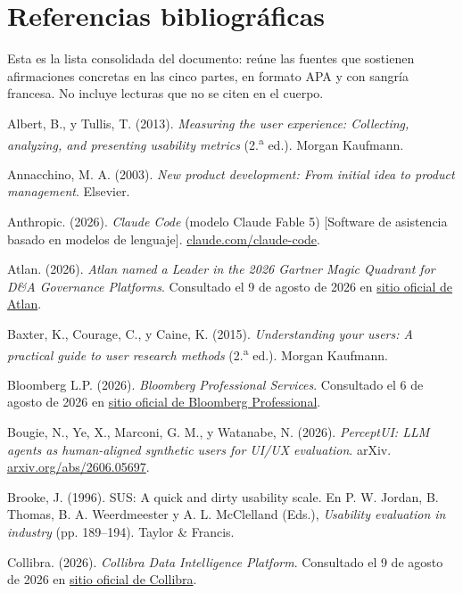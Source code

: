 \clearpage
\section{Referencias bibliográficas}\label{sec:a5-referencias}

Esta es la lista consolidada del documento: reúne las fuentes que sostienen afirmaciones concretas
en las cinco partes, en formato APA y con sangría francesa. No incluye lecturas que no se citen en
el cuerpo.

\begin{uxreferencias}
Albert, B., y Tullis, T. (2013). \textit{Measuring the user experience: Collecting, analyzing, and
presenting usability metrics} (2.\textsuperscript{a} ed.). Morgan Kaufmann.

Annacchino, M. A. (2003). \textit{New product development: From initial idea to product
management}. Elsevier.

Anthropic. (2026). \textit{Claude Code} (modelo Claude Fable 5) [Software de asistencia basado en
modelos de lenguaje]. \href{https://claude.com/claude-code}{claude.com/claude-code}.

Atlan. (2026). \textit{Atlan named a Leader in the 2026 Gartner Magic Quadrant for D\&A Governance
Platforms}. Consultado el 9 de agosto de 2026 en
\href{https://atlan.com/}{sitio oficial de Atlan}.

Baxter, K., Courage, C., y Caine, K. (2015). \textit{Understanding your users: A practical guide
to user research methods} (2.\textsuperscript{a} ed.). Morgan Kaufmann.

Bloomberg L.P. (2026). \textit{Bloomberg Professional Services}. Consultado el 6 de agosto de 2026
en \href{https://www.bloomberg.com/professional/}{sitio oficial de Bloomberg Professional}.

Bougie, N., Ye, X., Marconi, G. M., y Watanabe, N. (2026). \textit{PerceptUI: LLM agents as
human-aligned synthetic users for UI/UX evaluation}. arXiv.
\href{https://arxiv.org/abs/2606.05697}{arxiv.org/abs/2606.05697}.

Brooke, J. (1996). SUS: A quick and dirty usability scale. En P. W. Jordan, B. Thomas,
B. A. Weerdmeester y A. L. McClelland (Eds.), \textit{Usability evaluation in industry}
(pp. 189--194). Taylor \& Francis.

Collibra. (2026). \textit{Collibra Data Intelligence Platform}. Consultado el 9 de agosto de 2026
en \href{https://www.collibra.com/}{sitio oficial de Collibra}.


\end{uxreferencias}
